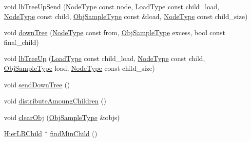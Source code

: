 \begin{DoxyCompactItemize}
\item 
void \hyperlink{structvt_1_1vrt_1_1collection_1_1lb_1_1_hierarchical_l_b_a8a9d35f8b4a8cd21461209136e64ad30}{lb\+Tree\+Up\+Send} (\hyperlink{namespacevt_a866da9d0efc19c0a1ce79e9e492f47e2}{Node\+Type} const node, \hyperlink{structvt_1_1vrt_1_1collection_1_1lb_1_1_base_l_b_a215e22b9f12678303f49615ae3be05cc}{Load\+Type} const child\+\_\+load, \hyperlink{namespacevt_a866da9d0efc19c0a1ce79e9e492f47e2}{Node\+Type} const child, \hyperlink{structvt_1_1vrt_1_1collection_1_1lb_1_1_load_sampler_base_l_b_a8d939a849ec0d6371c1c4d441ffb9b94}{Obj\+Sample\+Type} const \&load, \hyperlink{namespacevt_a866da9d0efc19c0a1ce79e9e492f47e2}{Node\+Type} const child\+\_\+size)
\item 
void \hyperlink{structvt_1_1vrt_1_1collection_1_1lb_1_1_hierarchical_l_b_a1e7609043ea2b9830c8dd08ee0c38aa1}{down\+Tree} (\hyperlink{namespacevt_a866da9d0efc19c0a1ce79e9e492f47e2}{Node\+Type} const from, \hyperlink{structvt_1_1vrt_1_1collection_1_1lb_1_1_load_sampler_base_l_b_a8d939a849ec0d6371c1c4d441ffb9b94}{Obj\+Sample\+Type} excess, bool const final\+\_\+child)
\item 
void \hyperlink{structvt_1_1vrt_1_1collection_1_1lb_1_1_hierarchical_l_b_a6f030d878c37c7dbca04f71304319930}{lb\+Tree\+Up} (\hyperlink{structvt_1_1vrt_1_1collection_1_1lb_1_1_base_l_b_a215e22b9f12678303f49615ae3be05cc}{Load\+Type} const child\+\_\+load, \hyperlink{namespacevt_a866da9d0efc19c0a1ce79e9e492f47e2}{Node\+Type} const child, \hyperlink{structvt_1_1vrt_1_1collection_1_1lb_1_1_load_sampler_base_l_b_a8d939a849ec0d6371c1c4d441ffb9b94}{Obj\+Sample\+Type} load, \hyperlink{namespacevt_a866da9d0efc19c0a1ce79e9e492f47e2}{Node\+Type} const child\+\_\+size)
\item 
void \hyperlink{structvt_1_1vrt_1_1collection_1_1lb_1_1_hierarchical_l_b_a1b7abcf40a8dfb63e9a2ee0842af413b}{send\+Down\+Tree} ()
\item 
void \hyperlink{structvt_1_1vrt_1_1collection_1_1lb_1_1_hierarchical_l_b_a4c944c21309ab6971895acfa197e91a4}{distribute\+Amoung\+Children} ()
\item 
void \hyperlink{structvt_1_1vrt_1_1collection_1_1lb_1_1_hierarchical_l_b_a2190300d890419550a28b91e57ffacf6}{clear\+Obj} (\hyperlink{structvt_1_1vrt_1_1collection_1_1lb_1_1_load_sampler_base_l_b_a8d939a849ec0d6371c1c4d441ffb9b94}{Obj\+Sample\+Type} \&objs)
\item 
\hyperlink{structvt_1_1vrt_1_1collection_1_1lb_1_1_hier_l_b_child}{Hier\+L\+B\+Child} $\ast$ \hyperlink{structvt_1_1vrt_1_1collection_1_1lb_1_1_hierarchical_l_b_a4064a53d865ffe55ba520f0c75e9018d}{find\+Min\+Child} ()

\end{DoxyCompactItemize}
